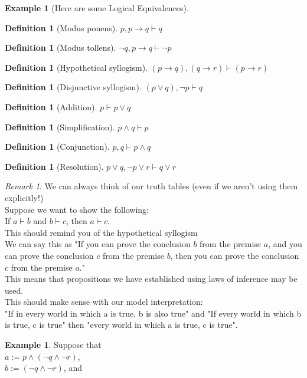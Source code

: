 \documentclass[letterpaper,10pt]{article}
\theoremstyle{plain}
\theoremstyle{definition}
\newtheorem{defn}[thm]{Definition}
\newtheorem{exmp}[thm]{Example}
\theoremstyle{remark}
\newtheorem{rem}[thm]{Remark}
\providecommand{\land}{\ensuremath{\wedge}}
\providecommand{\lor}{\ensuremath{\vee}}
\begin{document}
\begin{exmp}[Here are some Logical Equivalences]
\begin{defn}[Modus ponens]
$p,p\to q \vdash q$
\end{defn}

\begin{defn}[Modus tollens]
$\lnot q,p\to q \vdash \lnot p$
\end{defn}
\begin{defn}[Hypothetical syllogism]
$(p \to q) , (q \to r) \vdash (p \to r)$
\end{defn}
\begin{defn}[Disjunctive syllogism]
$(p \lor q),\lnot p \vdash q$
\end{defn}
\begin{defn}[Addition]
$p \vdash p \lor q$
\end{defn}
\begin{defn}[Simplification]
$p \land q\vdash p$
\end{defn}
\begin{defn}[Conjunction]
$p,q \vdash p \land q$
\end{defn}
\begin{defn}[Resolution]
$p \lor q, \lnot p \lor r  \vdash q \lor r$
\end{defn}
\newpage 
\begin{rem}
We can always think of our truth tables (even if we aren't using them explicitly!)\\
Suppose we want to show the following:\\
If $a\vdash b$ and $b \vdash c$, then $a\vdash c$. \\
This should remind you of the hypothetical syllogism\\
We can say this as "If you can prove the conclusion $b$ from the premise $a$, and you can prove the conclusion $c$ from the premise $b$, then you can prove the conclusion $c$ from the premise $a$."
\\
This means that propositions we have established using laws of inference may be used.
\\
This should make sense with our model interpretation:\\
"If in every world in which a is true, b is also true" and "If every world in which b is true, c is true" then "every world in which a is true, c is true". 
\\
\end{rem}
\begin{exmp}
Suppose that \\
$a :=p\land (\lnot q \land \lnot r)$,\\
$b:= (\lnot q \land \lnot r)$, and \\

\end{exmp}
\end{exmp}
\end{document}
